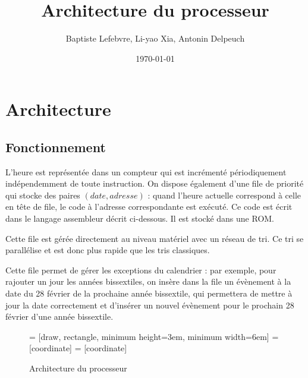 \documentclass[a4paper]{article}
\begin{document}
\title{Architecture du processeur}
\author{Baptiste Lefebvre, Li-yao Xia, Antonin Delpeuch}
\date{\today}

\maketitle

\section{Architecture}

\subsection{Fonctionnement}

L'heure est représentée dans un compteur qui est incrémenté
périodiquement indépendemment de toute instruction.
On dispose également d'une file de priorité qui stocke des paires $(date,
adresse)$ : quand l'heure actuelle correspond à celle en tête de file, le
code à l'adresse correspondante est exécuté. Ce code est écrit dans le
langage assembleur décrit ci-dessous. Il est stocké dans une ROM.

Cette file est gérée directement au niveau matériel avec un r\'{e}seau de
tri. Ce tri se parallélise et est donc plus rapide que les tris classiques.

Cette file permet de gérer les exceptions du calendrier : par exemple,
pour rajouter un jour les années bissextiles, on insère dans la file un
évènement à la date du 28 février de la prochaine année bissextile,
qui permettera de mettre à jour la date correctement et d'insérer un nouvel évènement pour
le prochain 28 février d'une année bissextile.

\begin{figure}
    \centering
     = [draw, rectangle, minimum height=3em, minimum width=6em]
     = [coordinate]
     = [coordinate]
    \caption{Architecture du processeur}
\end{figure}
\end{document}
